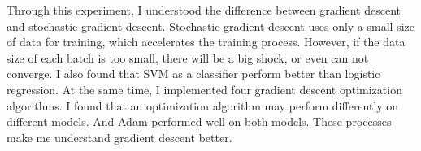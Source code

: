\documentclass[journal, a4paper]{IEEEtran}
\begin{document}
    Through this experiment, I understood the difference between gradient descent and stochastic gradient descent. Stochastic gradient descent uses only a small size of data for training, which accelerates the training process. However, if the data size of each batch is too small, there will be a big shock, or even can not converge.
    I also found that SVM as a classifier perform better than logistic regression.
    At the same time, I implemented four gradient descent optimization algorithms. I found that an optimization algorithm may perform differently on different models.
    And Adam performed well on both models. These processes make me understand gradient descent better.


\end{document}
